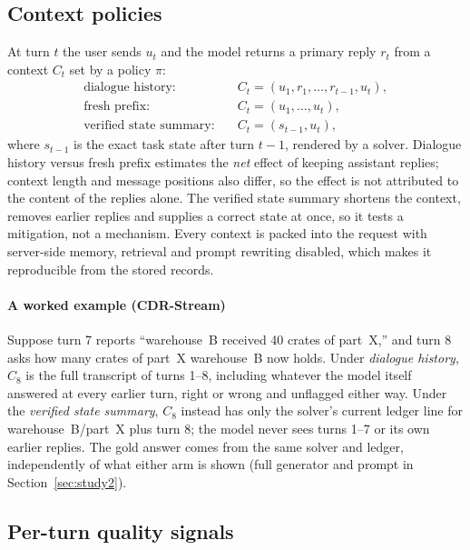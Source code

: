 \subsection{Context policies}

At turn $t$ the user sends $u_t$ and the model returns a primary reply $r_t$
from a context $C_t$ set by a policy $\pi$:
\begin{align}
  \text{dialogue history:}\quad & C_t = (u_1, r_1, \dots, r_{t-1}, u_t),\\
  \text{fresh prefix:}\quad & C_t = (u_1, \dots, u_t),\\
  \text{verified state summary:}\quad & C_t = (s_{t-1}, u_t),
\end{align}
where $s_{t-1}$ is the exact task state after turn $t-1$, rendered by a
solver. Dialogue history versus fresh prefix estimates the \emph{net} effect of
keeping assistant replies; context length and message positions also differ,
so the effect is not attributed to the content of the replies alone. The
verified state summary shortens the context, removes earlier replies and
supplies a correct state at once, so it tests a mitigation, not a mechanism.
Every context is packed into the request with server-side memory, retrieval and
prompt rewriting disabled, which makes it reproducible from the stored records.

\paragraph{A worked example (CDR-Stream)}
Suppose turn 7 reports ``warehouse~B received 40 crates of part~X,'' and turn
8 asks how many crates of part~X warehouse~B now holds. Under \emph{dialogue
history}, $C_8$ is the full transcript of turns 1--8, including whatever the
model itself answered at every earlier turn, right or wrong and unflagged
either way. Under the \emph{verified state summary}, $C_8$ instead has only
the solver's current ledger line for warehouse~B/part~X plus turn 8; the model
never sees turns 1--7 or its own earlier replies. The gold answer comes from
the same solver and ledger, independently of what either arm is shown
(full generator and prompt in Section~\ref{sec:study2}).

\subsection{Per-turn quality signals}

